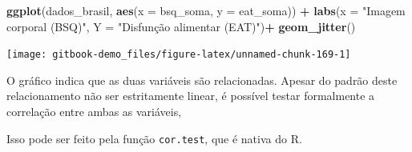 \documentclass[
]{book}
\newenvironment{Shaded}{\begin{snugshade}}{\end{snugshade}}
\newcommand{\DataTypeTok}[1]{\textcolor[rgb]{0.13,0.29,0.53}{#1}}
\newcommand{\KeywordTok}[1]{\textcolor[rgb]{0.13,0.29,0.53}{\textbf{#1}}}
\newcommand{\NormalTok}[1]{#1}
\newcommand{\OperatorTok}[1]{\textcolor[rgb]{0.81,0.36,0.00}{\textbf{#1}}}
\newcommand{\StringTok}[1]{\textcolor[rgb]{0.31,0.60,0.02}{#1}}
\begin{document}
\begin{Shaded}
\begin{Highlighting}[]
\KeywordTok{ggplot}\NormalTok{(dados_brasil, }\KeywordTok{aes}\NormalTok{(}\DataTypeTok{x =}\NormalTok{ bsq_soma, }\DataTypeTok{y =}\NormalTok{ eat_soma)) }\OperatorTok{+}
\StringTok{  }\KeywordTok{labs}\NormalTok{(}\DataTypeTok{x =} \StringTok{"Imagem corporal (BSQ)"}\NormalTok{, }\DataTypeTok{Y =} \StringTok{"Disfunção alimentar (EAT)"}\NormalTok{)}\OperatorTok{+}
\StringTok{  }\KeywordTok{geom_jitter}\NormalTok{()}
\end{Highlighting}
\end{Shaded}

\begin{center}\texttt{[image: gitbook-demo\_files/figure-latex/unnamed-chunk-169-1]} \end{center}

O gráfico indica que as duas variáveis são relacionadas. Apesar do
padrão deste relacionamento não ser estritamente linear, é possível
testar formalmente a correlação entre ambas as variáveis,

Isso pode ser feito pela função \texttt{cor.test}, que é nativa do R.

\begin{Shaded}
\end{Shaded}
\end{document}
